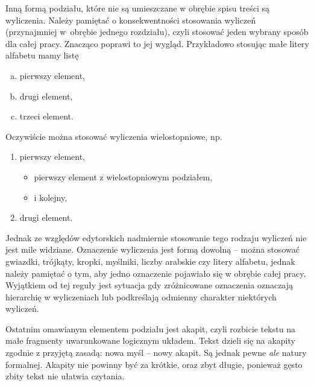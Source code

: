 Inną formą podziału, które nie są umieszczane w obrębie spisu treści są wyliczenia. Należy pamiętać o konsekwentności stosowania wyliczeń (przynajmniej w~obrębie jednego rozdziału), czyli stosować jeden wybrany sposób dla całej pracy. Znacząco poprawi to jej wygląd. Przykładowo stosując małe litery alfabetu mamy listę
\begin{enumerate}[(a)]
	\item pierwszy element,
	\item drugi element,
	\item trzeci element.
\end{enumerate}
Oczywiście można stosować wyliczenia wielostopniowe, np.
\begin{enumerate}
	\item pierwszy element,
		\begin{itemize}
			\item pierwszy element z wielostopniowym podziałem,
			\item i kolejny,
		\end{itemize}
	\item drugi element.
\end{enumerate}
Jednak ze względów edytorskich nadmiernie stosowanie tego rodzaju wyliczeń nie jest mile widziane. Oznaczenie wyliczenia jest formą dowolną -- można stosować gwiazdki, trójkąty, kropki, myślniki, liczby arabskie czy litery alfabetu, jednak należy pamiętać o tym, aby jedno oznaczenie pojawiało się w obrębie całej pracy. Wyjątkiem od tej reguły jest sytuacja gdy zróżnicowane oznaczenia oznaczają hierarchię w wyliczeniach lub podkreślają odmienny charakter niektórych wyliczeń.

Ostatnim omawianym elementem podziału jest akapit, czyli rozbicie tekstu na małe fragmenty uwarunkowane logicznym układem. Tekst dzieli się na akapity zgodnie z przyjętą zasadą: nowa myśl -- nowy akapit. Są jednak pewne \textit{ale} natury formalnej. Akapity nie powinny być za krótkie, oraz zbyt długie, ponieważ gęsto zbity tekst nie ułatwia czytania. 

